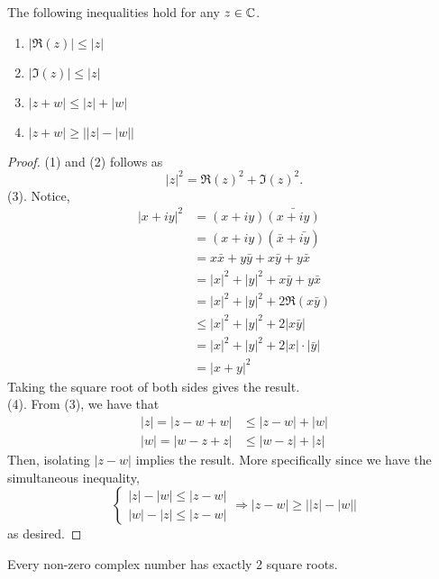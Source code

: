 \documentclass[11pt]{article}
\begin{document}
\begin{prop}
	The following inequalities hold for any $z \in \mathbb{C}$.
	\begin{enumerate}
		\item $|\Re(z)| \leq |z|$
		\item $|\Im(z)| \leq |z|$
		\item $|z + w| \leq |z| + |w|$
		\item $|z + w| \geq \bigg| |z| - |w|\bigg|$
	\end{enumerate}
	\begin{proof}
		(1) and (2) follows as
		\begin{equation*}
			|z|^2 = \Re(z)^2 + \Im(z)^2.
		\end{equation*}
		(3). Notice,
		\begin{align*}
			|x + iy|^2 &= (x + iy)\bar{(x + iy)}\\
					   &= (x + iy)(\bar{x} + \bar{iy})\\
					   &= x\bar x + y \bar y + x \bar y + y \bar x\\
					   &= |x|^2 + |y|^2 + x \bar y + y \bar x\\
					   &= |x|^2 + |y|^2 + 2\Re(x\bar y)\\
					   &\leq |x|^2 + |y|^2 + 2|x\bar y|\\
					   &= |x|^2 + |y|^2 + 2|x| \cdot |\bar y|\\
					   &= |x + y|^2
		\end{align*}
		Taking the square root of both sides gives the result.\\

		(4). From (3), we have that
		\begin{align*}
			|z| = |z - w + w| &\leq |z - w| + |w|\\
			|w| = |w - z + z| &\leq |w - z| + |z|
		\end{align*}
		Then, isolating $|z - w|$ implies the result. More specifically since we
		have the simultaneous inequality, \begin{equation*}
			\begin{cases}
				|z| - |w| \leq |z - w| \\
				|w| - |z| \leq |z - w|
			\end{cases}
			\Rightarrow
			|z - w| \geq \bigg| |z| - |w| \bigg|
		\end{equation*}
		as desired.
	\end{proof}
\end{prop}
\begin{prop}
	Every non-zero complex number has exactly 2 square roots.
\end{prop}
\end{document}
